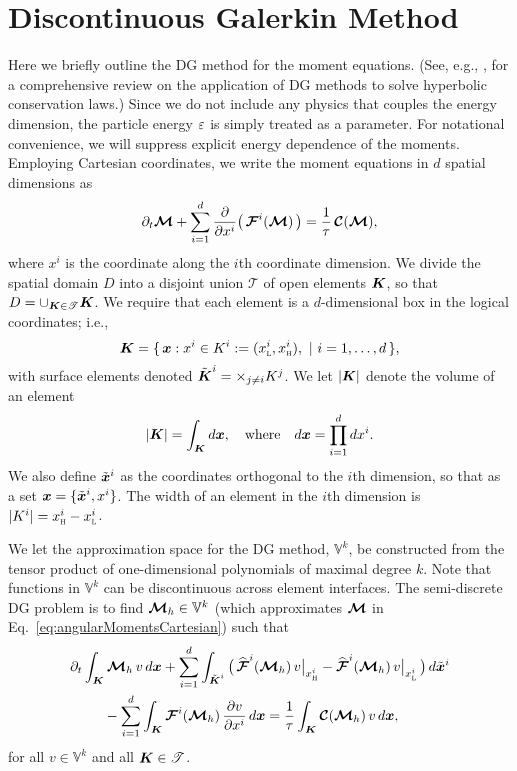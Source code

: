 \section{Discontinuous Galerkin Method}
\label{sec:dg}

Here we briefly outline the DG method for the moment equations.  
(See, e.g., \cite{cockburnShu_2001}, for a comprehensive review on the application of DG methods to solve hyperbolic conservation laws.)  
Since we do not include any physics that couples the energy dimension, the particle energy $\varepsilon$ is simply treated as a parameter.  
For notational convenience, we will suppress explicit energy dependence of the moments.  
Employing Cartesian coordinates, we write the moment equations in $d$ spatial dimensions as
\begin{equation}
  \partial_{t}{\boldsymbol{\mathcal{M}}}+\sum_{i=1}^{d}\frac{\partial }{\partial x^{i}}\big(\,\boldsymbol{\mathcal{F}}^{i}(\boldsymbol{\mathcal{M}})\,\big)
  =\frac{1}{\tau}\,\boldsymbol{\mathcal{C}}(\boldsymbol{\mathcal{M}}),
  \label{eq:angularMomentsCartesian}
\end{equation}
where $x^{i}$ is the coordinate along the $i$th coordinate dimension.  
We divide the spatial domain $D$ into a disjoint union $\mathscr{T}$ of open elements $\boldsymbol{K}$, so that $D = \cup_{\boldsymbol{K} \in \mathscr{T}}\boldsymbol{K}$.  
We require that each element is a $d$-dimensional box in the logical coordinates; i.e.,
\begin{equation}
  \boldsymbol{K}=\{\,\boldsymbol{x} : x^{i} \in K^{i} := (x_{\textnormal{\tiny\textsc{L}}}^{i},x_{\textnormal{\tiny\textsc{H}}}^{i}),~|~i=1,\ldots,d\,\}, 
\end{equation}
with surface elements denoted $\tilde{\boldsymbol{K}}^{i}=\times_{j\ne i}K^{j}$.  
We let $|\boldsymbol{K}|$ denote the volume of an element
\begin{equation}
  |\boldsymbol{K}| = \int_{\boldsymbol{K}}d\boldsymbol{x}, \quad\text{where}\quad d\boldsymbol{x} = \prod_{i=1}^{d}dx^{i}.  
\end{equation}
We also define $\tilde{\boldsymbol{x}}^{i}$ as the coordinates orthogonal to the $i$th dimension, so that as a set $\boldsymbol{x}=\{\tilde{\boldsymbol{x}}^{i},x^{i}\}$.  
The width of an element in the $i$th dimension is $|K^{i}|=x_{\textnormal{\tiny\textsc{H}}}^{i}-x_{\textnormal{\tiny\textsc{L}}}^{i}$.  

We let the approximation space for the DG method, $\mathbb{V}^{k}$, be constructed from the tensor product of one-dimensional polynomials of maximal degree $k$.  
Note that functions in $\mathbb{V}^{k}$ can be discontinuous across element interfaces.  
The semi-discrete DG problem is to find $\boldsymbol{\mathcal{M}}_{h}\in\mathbb{V}^{k}$ (which approximates $\boldsymbol{\mathcal{M}}$ in Eq.~\eqref{eq:angularMomentsCartesian}) such that
\begin{align}
  &\partial_{t}{}\int_{\boldsymbol{K}}\boldsymbol{\mathcal{M}}_{h}\,v\,d\boldsymbol{x}
  +\sum_{i=1}^{d}\int_{\tilde{\boldsymbol{K}}^{i}}
  \big(\,
    \widehat{\boldsymbol{\mathcal{F}}}^{i}(\boldsymbol{\mathcal{M}}_{h})\,v\big|_{x_{\textnormal{\tiny\textsc{H}}}^{i}}
    -\widehat{\boldsymbol{\mathcal{F}}}^{i}(\boldsymbol{\mathcal{M}}_{h})\,v\big|_{x_{\textnormal{\tiny\textsc{L}}}^{i}}
  \,\big)\,d\tilde{\boldsymbol{x}}^{i} \nonumber \\
  &\hspace{24pt}
  -\sum_{i=1}^{d}\int_{\boldsymbol{K}}\boldsymbol{\mathcal{F}}^{i}(\boldsymbol{\mathcal{M}}_{h})\,\frac{\partial v}{\partial x^{i}}\,d\boldsymbol{x}
  =\frac{1}{\tau}\int_{\boldsymbol{K}}\boldsymbol{\mathcal{C}}(\boldsymbol{\mathcal{M}}_{h})\,v\,d\boldsymbol{x},
  \label{eq:semidiscreteDG}
\end{align}
for all $v\in\mathbb{V}^{k}$ and all $\boldsymbol{K}\in\mathscr{T}$.  

